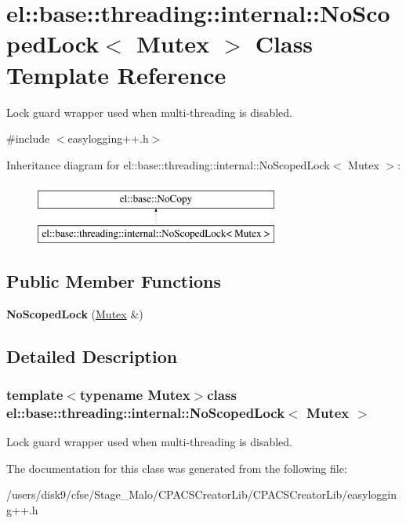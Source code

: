 \hypertarget{classel_1_1base_1_1threading_1_1internal_1_1NoScopedLock}{\section{el\-:\-:base\-:\-:threading\-:\-:internal\-:\-:No\-Scoped\-Lock$<$ Mutex $>$ Class Template Reference}
\label{classel_1_1base_1_1threading_1_1internal_1_1NoScopedLock}
}


Lock guard wrapper used when multi-\/threading is disabled.  




{\ttfamily \#include $<$easylogging++.\-h$>$}

Inheritance diagram for el\-:\-:base\-:\-:threading\-:\-:internal\-:\-:No\-Scoped\-Lock$<$ Mutex $>$\-:\begin{figure}[H]
\begin{center}
\leavevmode
\includegraphics[height=2.000000cm]{classel_1_1base_1_1threading_1_1internal_1_1NoScopedLock}
\end{center}
\end{figure}
\subsection*{Public Member Functions}
\begin{DoxyCompactItemize}
\item 
\hypertarget{classel_1_1base_1_1threading_1_1internal_1_1NoScopedLock_a020f8cea6e83f40ea29662ef57a58235}{{\bfseries No\-Scoped\-Lock} (\hyperlink{classel_1_1base_1_1threading_1_1internal_1_1NoMutex}{Mutex} \&)}\label{classel_1_1base_1_1threading_1_1internal_1_1NoScopedLock_a020f8cea6e83f40ea29662ef57a58235}

\end{DoxyCompactItemize}


\subsection{Detailed Description}
\subsubsection*{template$<$typename Mutex$>$class el\-::base\-::threading\-::internal\-::\-No\-Scoped\-Lock$<$ Mutex $>$}

Lock guard wrapper used when multi-\/threading is disabled. 

The documentation for this class was generated from the following file\-:\begin{DoxyCompactItemize}
\item 
/users/disk9/cfse/\-Stage\-\_\-\-Malo/\-C\-P\-A\-C\-S\-Creator\-Lib/\-C\-P\-A\-C\-S\-Creator\-Lib/easylogging++.\-h\end{DoxyCompactItemize}
